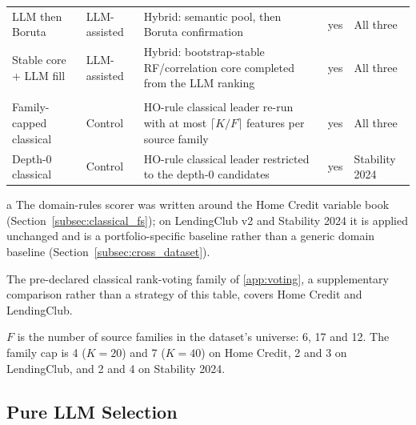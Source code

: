 \documentclass[final,5p,twocolumn]{elsarticle}
\newcommand{\Kfeat}{K}
\begin{document}
\begin{table}[htbp]
\begin{threeparttable}
\begin{tabular}{@{}llL{46mm}cl@{}}
LLM then Boruta & LLM-assisted & Hybrid: semantic pool, then Boruta confirmation & yes & All three \\
Stable core + LLM fill & LLM-assisted & Hybrid: bootstrap-stable RF/correlation core completed from the LLM ranking & yes & All three \\
\addlinespace
{} \\
Family-capped classical & Control & HO-rule classical leader re-run with at most $\lceil \Kfeat/F\rceil$ features per source family & yes & All three \\
Depth-0 classical & Control & HO-rule classical leader restricted to the depth-0 candidates & yes & Stability 2024 \\
\bottomrule
\end{tabular}
\begin{tablenotes}\footnotesize
\item[a] The domain-rules scorer was written around the Home Credit variable book (Section~\ref{subsec:classical_fs}); on LendingClub v2 and Stability 2024 it is applied unchanged and is a portfolio-specific baseline rather than a generic domain baseline (Section~\ref{subsec:cross_dataset}).
\item The pre-declared classical rank-voting family of \ref{app:voting}, a supplementary comparison rather than a strategy of this table, covers Home Credit and LendingClub.
\item $F$ is the number of source families in the dataset's universe: 6, 17 and 12. The family cap is 4 ($\Kfeat=20$) and 7 ($\Kfeat=40$) on Home Credit, 2 and 3 on LendingClub, and 2 and 4 on Stability 2024.
\end{tablenotes}
\end{threeparttable}
\end{table}

\subsection{Pure LLM Selection}
\label{subsec:llm_fs}
\end{document}
